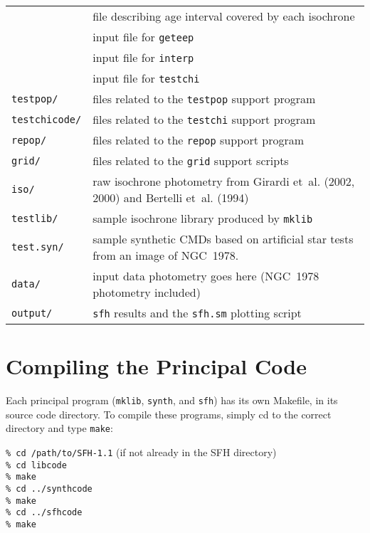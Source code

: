 \documentclass[12pt]{book}
\def\ttg{\tt\color{DarkGreen}}
\begin{document}
{\begin{tabular}{|l|l|}
\hspace{20pt}{\ttg /dtime.dat} & file describing age interval covered by each isochrone\\
\hspace{20pt}{\ttg /geteep.dat} & input file for {\ttg geteep} \\
\hspace{20pt}{\ttg /interp.dat} & input file for {\ttg interp} \\
\hspace{20pt}{\ttg /testchi.dat} & input file for {\ttg testchi} \\
{\ttg testpop/} & files related to the {\ttg testpop} support program\\
{\ttg testchicode/} & files related to the {\ttg testchi} support program\\
{\ttg repop/}   & files related to the {\ttg repop} support program\\
{\ttg grid/}    & files related to the {\ttg grid} support scripts\\
{\ttg iso/}     & raw isochrone photometry from Girardi et~al. (2002, 2000) 
                  and Bertelli et~al. (1994)\\
{\ttg testlib/}\footnotemark[1]  & sample isochrone library produced by {\ttg mklib}\\
{\ttg test.syn/}\footnotemark[1] & sample synthetic CMDs based on artificial star tests
                                   from an image of NGC~1978.\\
{\ttg data/}   & input data photometry goes here (NGC~1978 photometry included)\\
{\ttg output/} & {\ttg sfh} results and the {\ttg sfh.sm} plotting script\\ \hline
\end{tabular}
}


\clearpage

\section{Compiling the Principal Code}

Each principal program ({\ttg mklib}, {\ttg synth}, and {\ttg sfh}) 
has its own Makefile, in its source code directory.  To compile these 
programs, simply cd to the correct directory and type {\ttg make}:

\medskip
\noindent
{\ttg \% cd /path/to/SFH-1.1} \hfill (if not already in the SFH directory) \\
{\ttg \% cd libcode} \\
{\ttg \% make} \\
{\ttg \% cd ../synthcode} \\
{\ttg \% make} \\
{\ttg \% cd ../sfhcode} \\
{\ttg \% make}
\end{document}
